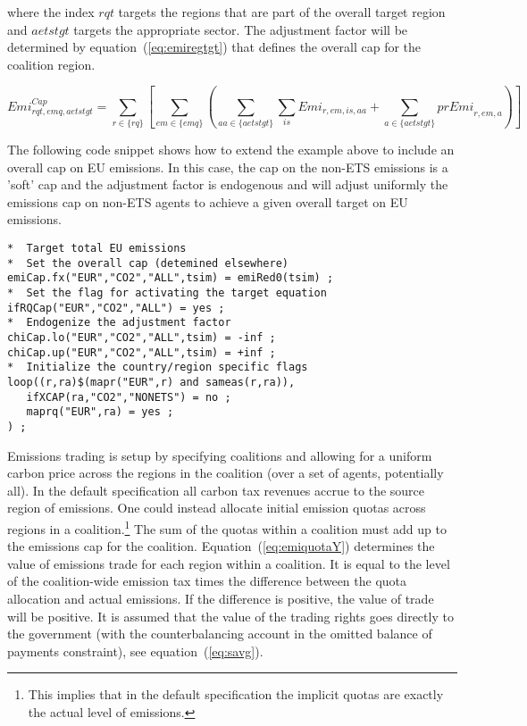 \documentclass[11pt,letterpaper]{report}
\begin{document}
\noindent where the index $\mathit{rqt}$ targets the regions that are part of the overall target region
and $\mathit{aetstgt}$ targets the appropriate sector. The adjustment factor will be determined
by equation~(\ref{eq:emiregtgt}) that defines the overall cap for the coalition region.

\begin{equation}
\label{eq:emiregtgt}
\mathit{Emi}^{\mathit{Cap}}_{\mathit{rqt},\mathit{emq},\mathit{aetstgt}}
=
\sum_{r \in \{ \mathit{rq}\}}
{\left[
\sum_{\mathit{em} \in \{\mathit{emq}\}}
\left( \sum_{\mathit{aa} \in \{\mathit{aetstgt}\}}
\sum_{\mathit{is}} {\mathit{Emi}_{r,\mathit{em},\mathit{is},\mathit{aa}}}
 +
\sum_{\mathit{a} \in \{\mathit{aetstgt}\}}{\mathit{prEmi}_{r,\mathit{em},a}}
\right)
\right]}
\end{equation}

The following code snippet shows how to extend the example above to include
an overall cap on EU emissions. In this case, the cap on the non-ETS emissions
is a 'soft' cap and the adjustment factor is endogenous and will adjust
uniformly the emissions cap on non-ETS agents to achieve a given
overall target on EU emissions.

\begin{lstlisting}[language=GAMS, caption={Example of ETS regime with a hard overall cap}]
*  Target total EU emissions
*  Set the overall cap (detemined elsewhere)
emiCap.fx("EUR","CO2","ALL",tsim) = emiRed0(tsim) ;
*  Set the flag for activating the target equation
ifRQCap("EUR","CO2","ALL") = yes ;
*  Endogenize the adjustment factor
chiCap.lo("EUR","CO2","ALL",tsim) = -inf ;
chiCap.up("EUR","CO2","ALL",tsim) = +inf ;
*  Initialize the country/region specific flags
loop((r,ra)$(mapr("EUR",r) and sameas(r,ra)),
   ifXCAP(ra,"CO2","NONETS") = no ;
   maprq("EUR",ra) = yes ;
) ;
\end{lstlisting}

Emissions trading is setup by specifying coalitions and allowing for a uniform
carbon price across the regions in the coalition (over a set of agents, potentially all).
In the default specification all
carbon tax revenues accrue to the source region of emissions. One could
instead allocate initial emission quotas across regions in a coalition.\footnote{This implies
that in the default specification the implicit quotas are exactly the
actual level of emissions.} The sum of
the quotas within a coalition must add up to the emissions cap for the
coalition. Equation~(\ref{eq:emiquotaY}) determines the value of emissions trade
for each region within a coalition. It is equal to the level of the
coalition-wide emission tax times the difference between the quota allocation
and actual emissions. If the difference is positive, the value of trade will be
positive. It is assumed that the value of the trading rights goes directly to
the government (with the counterbalancing account in the omitted balance of
payments constraint), see equation~(\ref{eq:savg}).
\end{document}
